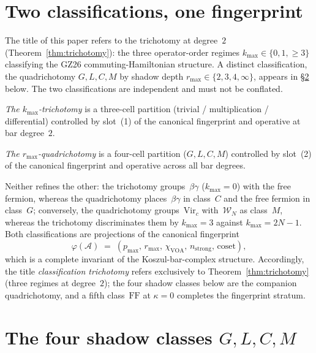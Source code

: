 \documentclass[11pt]{article}
\theoremstyle{definition}
\theoremstyle{remark}
\newcommand{\cA}{\mathcal{A}}
\newcommand{\Walg}{\mathcal{W}}
\numberwithin{equation}{section}
\begin{document}
\section{Two classifications, one fingerprint}
\label{sec:disambiguation-trichotomy-quadrichotomy}

The title of this paper refers to the trichotomy at degree~$2$
(Theorem~\ref{thm:trichotomy}): the three operator-order regimes
$k_{\max} \in \{0, 1, \geq 3\}$ classifying the GZ\textup{26}
commuting-Hamiltonian structure. A distinct classification, the
quadrichotomy $G, L, C, M$ by shadow depth
$r_{\max} \in \{2, 3, 4, \infty\}$, appears in \S\ref{sec:four-classes}
below. The two classifications are independent and must not be
conflated.

\emph{The $k_{\max}$-trichotomy} is a three-cell partition
(trivial / multiplication / differential) controlled by slot~(1) of
the canonical fingerprint and operative at bar degree~$2$.

\emph{The $r_{\max}$-quadrichotomy} is a four-cell partition
($G, L, C, M$) controlled by slot~(2) of the canonical fingerprint
and operative across all bar degrees.

Neither refines the other: the trichotomy groups~$\beta\gamma$
($k_{\max} = 0$) with the free fermion, whereas the quadrichotomy
places~$\beta\gamma$ in class~$C$ and the free fermion in class~$G$;
conversely, the quadrichotomy groups~$\mathrm{Vir}_c$ with~$\Walg_N$
as class~$M$, whereas the trichotomy discriminates them by
$k_{\max} = 3$ against $k_{\max} = 2N - 1$. Both classifications are
projections of the canonical fingerprint
\[
\varphi(\cA) \;=\; (p_{\max},\, r_{\max},\, \chi_{\mathrm{VOA}},\, n_{\mathrm{strong}},\, \mathrm{coset}),
\]
which is a complete invariant of the Koszul-bar-complex structure.
Accordingly, the title \emph{classification trichotomy} refers
exclusively to Theorem~\ref{thm:trichotomy} (three regimes at
degree~$2$); the four shadow classes below are the companion
quadrichotomy, and a fifth class~$\mathrm{FF}$ at $\kappa = 0$
completes the fingerprint stratum.

\section{The four shadow classes $G,L,C,M$}\label{sec:four-classes}
\end{document}

